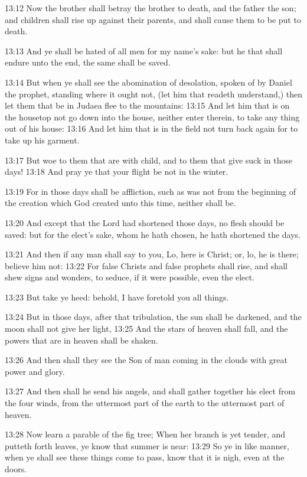 13:12 Now the brother shall betray the brother to death, and the father the son; and children shall rise up against their parents, and shall cause them to be put to death.

13:13 And ye shall be hated of all men for my name's sake: but he that shall endure unto the end, the same shall be saved.

13:14 But when ye shall see the abomination of desolation, spoken of by Daniel the prophet, standing where it ought not, (let him that readeth understand,) then let them that be in Judaea flee to the mountains: 13:15 And let him that is on the housetop not go down into the house, neither enter therein, to take any thing out of his house: 13:16 And let him that is in the field not turn back again for to take up his garment.

13:17 But woe to them that are with child, and to them that give suck in those days!  13:18 And pray ye that your flight be not in the winter.

13:19 For in those days shall be affliction, such as was not from the beginning of the creation which God created unto this time, neither shall be.

13:20 And except that the Lord had shortened those days, no flesh should be saved: but for the elect's sake, whom he hath chosen, he hath shortened the days.

13:21 And then if any man shall say to you, Lo, here is Christ; or, lo, he is there; believe him not: 13:22 For false Christs and false prophets shall rise, and shall shew signs and wonders, to seduce, if it were possible, even the elect.

13:23 But take ye heed: behold, I have foretold you all things.

13:24 But in those days, after that tribulation, the sun shall be darkened, and the moon shall not give her light, 13:25 And the stars of heaven shall fall, and the powers that are in heaven shall be shaken.

13:26 And then shall they see the Son of man coming in the clouds with great power and glory.

13:27 And then shall he send his angels, and shall gather together his elect from the four winds, from the uttermost part of the earth to the uttermost part of heaven.

13:28 Now learn a parable of the fig tree; When her branch is yet tender, and putteth forth leaves, ye know that summer is near: 13:29 So ye in like manner, when ye shall see these things come to pass, know that it is nigh, even at the doors.

